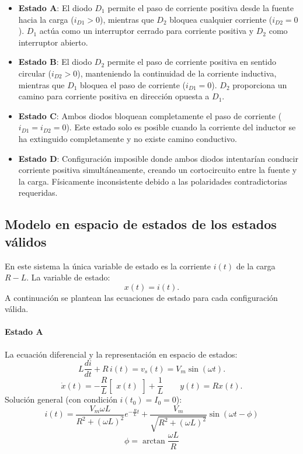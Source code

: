 \documentclass[conference]{IEEEtran}
\begin{document}
\begin{itemize}
      \item \textbf{Estado A}: 
      El diodo $D_1$ permite el paso de corriente positiva desde la fuente hacia la carga ($i_{D1} > 0$), mientras que $D_2$ bloquea cualquier corriente ($i_{D2} = 0$). $D_1$ actúa como un interruptor cerrado para corriente positiva y $D_2$ como interruptor abierto.

      \item \textbf{Estado B}: 
      El diodo $D_2$ permite el paso de corriente positiva en sentido circular ($i_{D2} > 0$), manteniendo la continuidad de la corriente inductiva, mientras que $D_1$ bloquea el paso de corriente ($i_{D1} = 0$). $D_2$ proporciona un camino para corriente positiva en dirección opuesta a $D_1$.

      \item \textbf{Estado C}: 
      Ambos diodos bloquean completamente el paso de corriente ($i_{D1} = i_{D2} = 0$). Este estado solo es posible cuando la corriente del inductor se ha extinguido completamente y no existe camino conductivo.

      \item \textbf{Estado D}: 
      Configuración imposible donde ambos diodos intentarían conducir corriente positiva simultáneamente, creando un cortocircuito entre la fuente y la carga. Físicamente inconsistente debido a las polaridades contradictorias requeridas.
\end{itemize}
 


\subsection{Modelo en espacio de estados de los estados válidos }
En este sistema la única variable de estado es la corriente \(i(t)\) de la carga \(R\!-\!L\). La variable de estado:
\[
x(t)=i(t).
\]
A continuación se plantean las ecuaciones de estado para cada configuración válida.

\paragraph{Estado A}
La ecuación diferencial y la representación en espacio de estados:
\[
L\frac{di}{dt} + R\,i(t) = v_s(t) = V_m\sin(\omega t).
\]
\[
\dot{x}(t)
=
-\dfrac{R}{L}
\begin{bmatrix}x(t)\end{bmatrix}
+
\dfrac{1}{L}
\qquad
y(t)=Rx(t).
\]
Solución general (con condición \(i(t_0)=I_0=0\)):
\begin{equation}
i(t) =\frac{V_m \omega L}{R^2 + (\omega L)^2} e^{-\frac{R}{L}t} + {\frac{V_m}{\sqrt{R^2 + (\omega L)^2}} \sin(\omega t - \phi)}
\label{ecu1}
\end{equation}
\[
\phi=\arctan\!\frac{\omega L}{R}
\]
\end{document}
